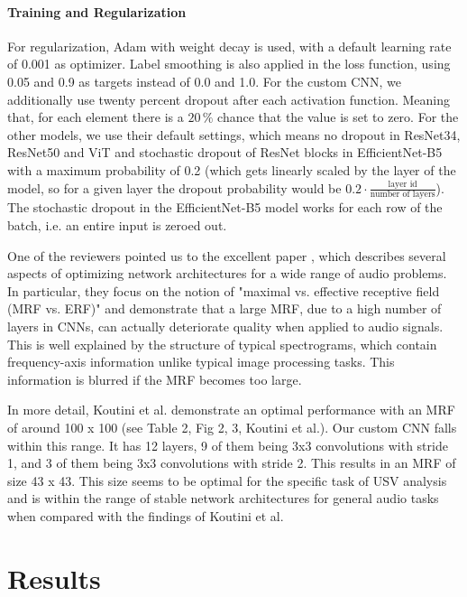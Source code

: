\documentclass[preprint,NumberedRefs]{JASA}
\begin{document}
\paragraph{Training and Regularization}
\label{sec:Training_and_regularization_CNN}

For regularization, Adam with weight decay is used, with a default learning rate of 0.001 as optimizer. \cite{loshchilov2019decoupled} Label smoothing is also applied in the loss function, using 0.05 and 0.9 as targets instead of 0.0 and 1.0.
%
For the custom CNN, we additionally use twenty percent dropout after each activation function. Meaning that, for each element there is a \(20\,\mathrm{\%} \) chance that the value is set to zero. \cite{JMLR:v15:srivastava14a}
%
For the other models, we use their default settings, which means no dropout in ResNet34, ResNet50 and ViT and stochastic dropout of ResNet blocks in EfficientNet-B5 with a maximum probability of 0.2 (which gets linearly scaled by the layer of the model, so for a given layer the dropout probability would be $0.2 \cdot \frac{\text{layer id}}{\text{number of layers}}$).
%
The stochastic dropout in the EfficientNet-B5 model works for each row of the batch, i.e. an entire input is zeroed out.

One of the reviewers pointed us to the excellent paper \cite{Koutini_2021}, which describes several aspects of optimizing network architectures for a wide range of audio problems. In particular, they focus on the notion of "maximal vs. effective receptive field (MRF vs. ERF)" and demonstrate that a large MRF, due to a high number of layers in CNNs, can actually deteriorate quality when applied to audio signals. This is well explained by the structure of typical spectrograms, which contain frequency-axis information unlike typical image processing tasks. This information is blurred if the MRF becomes too large. 

In more detail, Koutini et al. demonstrate an optimal performance with an MRF of around 100 x 100 (see Table 2, Fig 2, 3, Koutini et al.). \cite{Koutini_2021} Our custom CNN falls within this range. It has 12 layers, 9 of them being 3x3 convolutions with stride 1, and 3 of them being 3x3 convolutions with stride 2. This results in an MRF of size 43 x 43. This size seems to be optimal for the specific task of USV analysis and is within the range of stable network architectures for general audio tasks when compared with the findings of Koutini et al.\cite{Koutini_2021}


\section{Results}
\label{sec:Results}
\end{document}
